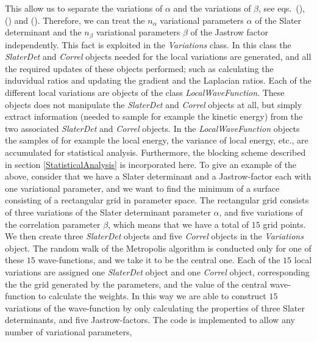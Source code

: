 This allow us to separate the variations of $\alpha$ and the
variations of $\beta$, see eqs.~(\label{trialWaveFunctionRatio}), 
(\label{trialWaveFunctionGradient}) and
(\label{trialWaveFunctionLaplacian}). Therefore, we can treat the
$n_{\alpha}$ variational parameters $\alpha$ of the Slater determinant
and the $n_{\beta}$ variational parameters $\beta$ of the Jastrow
factor independently. This fact is exploited in the \emph{Variations}
class. In this class the \emph{SlaterDet} and \emph{Correl} objects
needed for the local variations are generated, and all the required
updates of these objects performed; such as calculating the induvidual
ratios and updating the gradient and the Laplacian ratios. Each of the 
different local variations are objects of the class
\emph{LocalWaveFunction}. These objects does not manipulate the
\emph{SlaterDet} and \emph{Correl} objects at all, but simply extract
information (needed to sample for example the kinetic energy) from the
two associated \emph{SlaterDet} and \emph{Correl} objects. In the
\emph{LocalWaveFunction} objects the samples of for example the local
energy, the variance of local energy, etc., are accumulated for
statistical analysis. Furthermore, the blocking scheme described in
section \ref{StatisticalAnalysis} is incorporated here.
\newline
%
\newline
To give an example of the above, consider that we have a Slater
determinant and a Jastrow-factor each with one variational parameter,
and we want to find the minimum of a surface consisting of a
rectangular grid in parameter space. The rectangular grid consists of
three variations of the Slater determinant parameter $\alpha$, and
five variations of the correlation parameter $\beta$, which means that
we have a total of $15$ grid points. We then create three
\emph{SlaterDet} objects and five \emph{Correl} objects in the
\emph{Variations} object. The random walk of the Metropolis algorithm
is conducted only for one of these $15$ wave-functions, and we take it
to be the central one. Each of the $15$ local variations are assigned
one \emph{SlaterDet} object and one \emph{Correl} object,
corresponding the the grid generated by the parameters, and the value
of the central wave-function to calculate the weights. In this way we
are able to construct $15$ variations of the wave-function by only
calculating the properties of three Slater determinants, and five
Jastrow-factors.
\newline
%
\newline
The code is implemented to allow any number of variational parameters,
